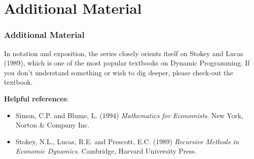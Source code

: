 \documentclass[aspectratio=169]{beamer}
\begin{document}
\section{Additional Material}

\begin{frame}
\frametitle{Additional Material}
In notation and exposition, the series closely orients itself on Stokey and Lucas (1989), which is one of the most popular textbooks on Dynamic Programming. If you don't understand something or wish to dig deeper, please check-out the textbook.
\medskip

\textbf{Helpful references}:
\begin{itemize}
\item Simon, C.P. and Blume, L. (1994) \textit{Mathematics for Economists}. New York, Norton \& Company Inc.
\item Stokey, N.L., Lucas, R.E. and Prescott, E.C. (1989) \textit{Recursive Methods in Economic Dynamics}. Cambridge, Harvard University Press.
\end{itemize}


\end{frame}
\end{document}
